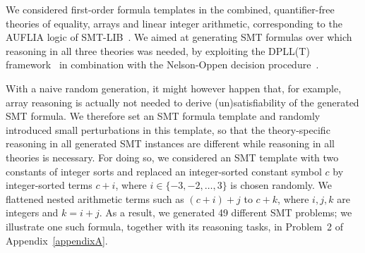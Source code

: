 We considered first-order formula templates in the combined,
quantifier-free 
theories of equality, arrays and linear integer arithmetic,
corresponding to the AUFLIA logic of
SMT-LIB~\cite{barrett2017smtlib}. We aimed at generating SMT formulas
over which reasoning in all three theories was needed, by exploiting
the DPLL(T) framework~\cite{Tinelli02} in combination with the
Nelson-Oppen decision procedure~\cite{Nelson79}.
%

With a  naive random generation,  it might however happen
that, for example, array reasoning is actually not needed to derive
(un)satisfi\-ability of the generated SMT formula. We therefore set an
SMT formula template and 
%
%
randomly introduced small perturbations in this template,  so that the
theory-specific reasoning in all generated SMT instances are
different while reasoning in all theories is necessary. 
For doing so, we considered an SMT template with two constants of
integer sorts and replaced an integer-sorted constant symbol $c$ by  integer-sorted terms $c+i$,
where $i \in \{-3,-2,\dots,3\}$ is chosen randomly. We flattened nested arithmetic terms such as $(c+i)+j$ to $c+k$,
where $i,j,k$ are integers and $k = i+j$. As a result, we
generated 49 different SMT problems; we illustrate one such formula, together
with its reasoning tasks, in Problem~2 of Appendix~\ref{appendixA}.

